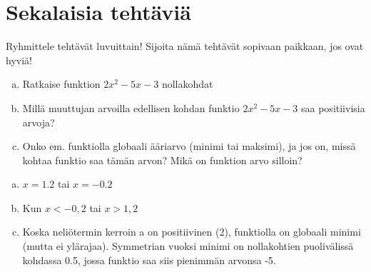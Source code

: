 \section{Sekalaisia tehtäviä}

Ryhmittele tehtävät luvuittain!
Sijoita nämä tehtävät sopivaan paikkaan, jos ovat hyviä!

\begin{tehtava}
  \begin{enumerate}[a)]
    \item Ratkaise funktion $2x^2 - 5x - 3$ nollakohdat
    \item Millä muuttujan arvoilla edellisen kohdan funktio $2x^2 - 5x - 3$ saa positiivisia arvoja?
    \item Onko em. funktiolla globaali ääriarvo (minimi tai maksimi), ja jos on, missä kohtaa funktio saa tämän arvon? Mikä on funktion arvo silloin?
  \end{enumerate}

  \begin{vastaus}
    \begin{enumerate}[a)]
      \item $x = 1.2$ tai $x = -0.2$
      \item Kun $x<-0,2$ tai $x>1,2$
      \item Koska neliötermin kerroin a on positiivinen (2), funktiolla on globaali minimi (mutta ei ylärajaa). Symmetrian vuoksi minimi on nollakohtien puolivälissä kohdassa 0.5, jossa funktio saa siis pienimmän arvonsa -5.
    \end{enumerate}
  \end{vastaus}
\end{tehtava}
